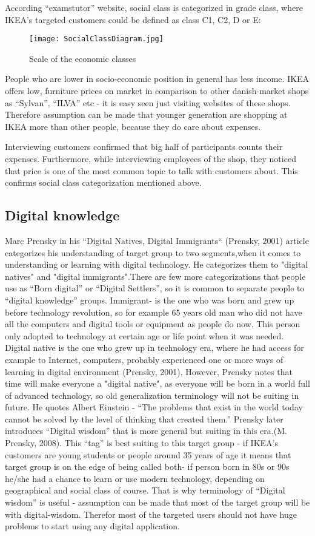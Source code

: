 According “examstutor” website, social class is categorized in grade class, where IKEA’s targeted customers could be defined as class C1, C2, D or E:
\begin{figure}[H]
\centering
\texttt{[image: SocialClassDiagram.jpg]}
\caption{Scale of the economic classes}
\end{figure}
People who are lower in socio-economic position in general has less income. IKEA offers low,  furniture prices on market in comparison to other danish-market shops as “Sylvan”, “ILVA” etc - it is easy seen just visiting websites of these shops. Therefore  assumption can be made that younger generation are shopping at IKEA more than other people, because they do care about expenses.  

Interviewing customers confirmed that big half of participants counts their expenses. Furthermore, while interviewing employees of the shop, they noticed that price is one of the most common topic to talk with customers about. This confirms social class categorization mentioned above. 

\subsection{Digital knowledge}
Marc Prensky in his “Digital Natives, Digital Immigrants“ (Prensky, 2001) article categorizes his understanding of target group to two segments,when it comes to understanding or learning with digital technology. He categorizes them to "digital natives" and "digital immigrants".There are few more categorizations that people use as “Born digital” or “Digital Settlers”, so it is common to separate people to “digital knowledge” groups.  Immigrant- is the one who was born and grew up before technology revolution, so for example 65 years old man who did not have all the computers and digital tools or equipment as people do now. This person only adopted to technology at certain age or life point when it was needed. Digital native is the one who grew up in technology era, where he had access for example to Internet, computers, probably experienced one or more ways of learning in digital environment (Prensky, 2001). However, Prensky notes that time will make everyone a "digital native", as everyone will be born in a world full of advanced technology, so old generalization terminology will not be suiting in future. He quotes Albert Einstein - “The problems that exist in the world today cannot be solved by the level of thinking that created them.” Prensky later introduces “Digital wisdom” that is more general but suiting in this era.(M. Prensky, 2008). This “tag” is best suiting to this target group - if IKEA’s customers are young students or people around 35 years of age it means that target group is on the edge of being called both- if person born in 80s or 90s he/she had a chance to learn or use modern technology, depending on geographical and social class of course. That is why terminology of “Digital wisdom” is useful - assumption can be made that most of the target group will be with digital-wisdom. Therefor most of the targeted users should not have huge problems to start using any digital application.

